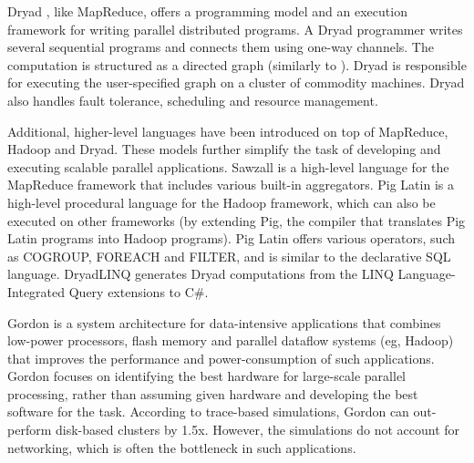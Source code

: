 \documentclass{acm_proc_article-sp}
\begin{document}
Dryad \cite{dryad}, like MapReduce, offers a programming model and an execution framework for writing parallel distributed programs. A Dryad programmer writes several sequential programs and connects them using one-way channels. The computation is structured as a directed graph (similarly to \cite{paralleldatabases}). Dryad is responsible for executing the user-specified graph on a cluster of commodity machines. Dryad also handles fault tolerance, scheduling and resource management.

Additional, higher-level languages have been introduced on top of MapReduce, Hadoop and Dryad. These models further simplify the task of developing and executing scalable parallel applications. Sawzall \cite{sawzall} is a high-level language for the MapReduce framework that includes various built-in aggregators. Pig Latin \cite{piglatin} is a high-level procedural language for the Hadoop framework, which can also be executed on other frameworks (by extending Pig, the compiler that translates Pig Latin programs into Hadoop programs). Pig Latin offers various operators, such as COGROUP, FOREACH and FILTER, and is similar to the declarative SQL language. DryadLINQ \cite{dryadlinq} generates Dryad computations from the LINQ Language-Integrated Query extensions to C\#.

Gordon \cite{gordon} is a system architecture for data-intensive applications that combines low-power processors, flash memory and parallel dataflow systems (eg, Hadoop) that improves the performance and power-consumption of such applications. Gordon focuses on identifying the best hardware for large-scale parallel processing, rather than assuming given hardware and developing the best software for the task. According to trace-based simulations, Gordon can out-perform disk-based clusters by 1.5x. However, the simulations do not account for networking, which is often the bottleneck in such applications.




\balancecolumns
\end{document}

